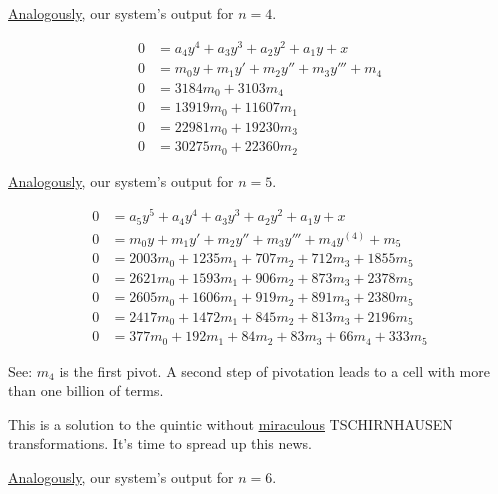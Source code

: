 \documentclass[12pt,a4paper]{article}
\begin{document}
\vspace{100mm}

\href{http://boralaemcasa.herokuapp.com/anyDegree/4.zip}{\color{blue}\underline{Analogously}}, our system's output for $n = 4$.

\begin{align}
0 &= a_4 y^4 + a_3 y^3 + a_2 y^2 + a_1 y + x \\
0 &= m_0 y + m_1 y' + m_2 y'' + m_3 y''' + m_4 \\
0 &= 3184 m_0 + 3103 m_4 \\
0 &= 13919 m_0 + 11607 m_1 \\
0 &= 22981 m_0 + 19230 m_3 \\
0 &= 30275 m_0 + 22360 m_2
\end{align}

\vspace{3mm}

\href{http://boralaemcasa.herokuapp.com/anyDegree/5.zip}{\color{blue}\underline{Analogously}}, our system's output for $n = 5$.

\begin{align}
0 &= a_5 y^5 + a_4 y^4 + a_3 y^3 + a_2 y^2 + a_1 y + x \\
0 &= m_0 y + m_1 y' + m_2 y'' + m_3 y''' + m_4 y^{(4)} + m_5 \\
0 &= 2003 m_0 + 1235 m_1 + 707 m_2 + 712 m_3 + 1855 m_5 \\
0 &= 2621 m_0 + 1593 m_1 + 906 m_2 + 873 m_3 + 2378 m_5 \\
0 &= 2605 m_0 + 1606 m_1 + 919 m_2 + 891 m_3 + 2380 m_5 \\
0 &= 2417 m_0 + 1472 m_1 + 845 m_2 + 813 m_3 + 2196 m_5 \\
0 &= 377 m_0 +  192 m_1 +  84 m_2 +  83 m_3 + 66 m_4 + 333 m_5
\end{align}

See: $m_4$ is the first pivot. A second step of pivotation leads to a cell with more than one billion of terms.

This is a solution to the quintic without \href{http://mathworld.wolfram.com/TschirnhausenTransformation.html}{\color{blue}\underline{miraculous}} TSCHIRNHAUSEN transformations. It's time to spread up this news.

\vspace{3mm}

\href{http://boralaemcasa.herokuapp.com/anyDegree/6.zip}{\color{blue}\underline{Analogously}}, our system's output for $n = 6$.
\end{document}

